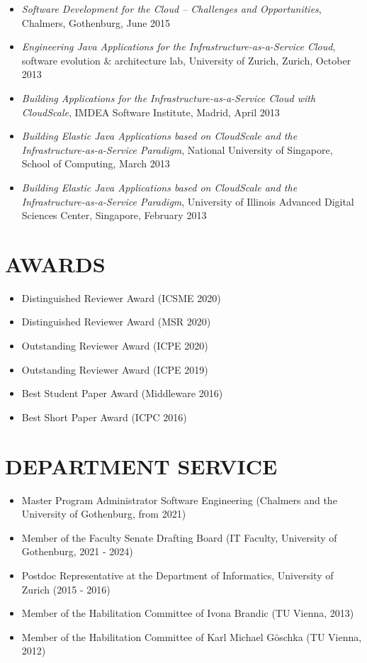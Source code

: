 \documentclass[paper=letter,fontsize=11pt]{scrartcl} %
\newcommand{\NewPart}[2]{\section*{\uppercase{#1} #2}}
\begin{document}
\begin{itemize}
\item \emph{Software Development for the Cloud -- Challenges and Opportunities}, Chalmers, Gothenburg, June 2015
\item \emph{Engineering Java Applications for the Infrastructure-as-a-Service Cloud}, software evolution \& architecture lab, University of Zurich, Zurich, October 2013
\item \emph{Building Applications for the Infrastructure-as-a-Service Cloud with CloudScale}, IMDEA Software Institute, Madrid, April 2013
\item \emph{Building Elastic Java Applications based on CloudScale and the Infrastructure-as-a-Service Paradigm}, National University of Singapore, School of Computing, March 2013
\item \emph{Building Elastic Java Applications based on CloudScale and the Infrastructure-as-a-Service Paradigm}, University of Illinois Advanced Digital Sciences Center, Singapore, February 2013
\end{itemize}

\NewPart{Awards}{}
\begin{itemize}
\item Distinguished Reviewer Award (ICSME 2020)  
\item Distinguished Reviewer Award (MSR 2020)
\item Outstanding Reviewer Award (ICPE 2020)
\item Outstanding Reviewer Award (ICPE 2019)
\item Best Student Paper Award (Middleware 2016)
\item Best Short Paper Award (ICPC 2016)
\end{itemize}


\NewPart{Department Service}{}
\begin{itemize}
\item Master Program Administrator Software Engineering (Chalmers and the University of Gothenburg, from 2021)
\item Member of the Faculty Senate Drafting Board (IT Faculty, University of Gothenburg, 2021 - 2024)
\item Postdoc Representative at the Department of Informatics, University of Zurich (2015 - 2016)
\item Member of the Habilitation Committee of Ivona Brandic (TU Vienna, 2013)
\item Member of the Habilitation Committee of Karl Michael G\"oschka (TU Vienna, 2012)
\end{itemize}
\end{document}
